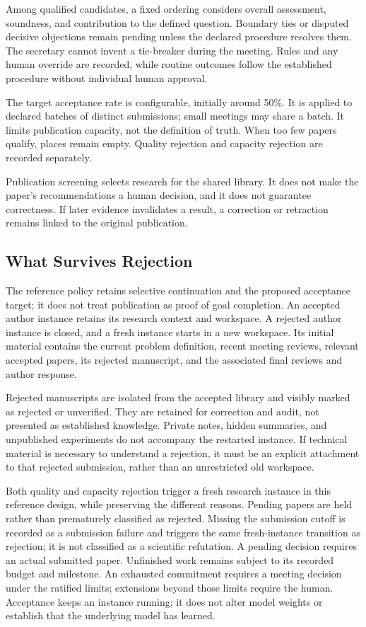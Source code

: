 \documentclass[11pt]{article}
\begin{document}
Among qualified candidates, a fixed ordering considers overall assessment, soundness, and contribution to the defined question. Boundary ties or disputed decisive objections remain pending unless the declared procedure resolves them. The secretary cannot invent a tie-breaker during the meeting. Rules and any human override are recorded, while routine outcomes follow the established procedure without individual human approval.

The target acceptance rate is configurable, initially around 50\%. It is applied to declared batches of distinct submissions; small meetings may share a batch. It limits publication capacity, not the definition of truth. When too few papers qualify, places remain empty. Quality rejection and capacity rejection are recorded separately.

Publication screening selects research for the shared library. It does not make the paper's recommendations a human decision, and it does not guarantee correctness. If later evidence invalidates a result, a correction or retraction remains linked to the original publication.

\subsection{What Survives Rejection}

The reference policy retains selective continuation and the proposed acceptance target; it does not treat publication as proof of goal completion. An accepted author instance retains its research context and workspace. A rejected author instance is closed, and a fresh instance starts in a new workspace. Its initial material contains the current problem definition, recent meeting reviews, relevant accepted papers, its rejected manuscript, and the associated final reviews and author response.

Rejected manuscripts are isolated from the accepted library and visibly marked as rejected or unverified. They are retained for correction and audit, not presented as established knowledge. Private notes, hidden summaries, and unpublished experiments do not accompany the restarted instance. If technical material is necessary to understand a rejection, it must be an explicit attachment to that rejected submission, rather than an unrestricted old workspace.

Both quality and capacity rejection trigger a fresh research instance in this reference design, while preserving the different reasons. Pending papers are held rather than prematurely classified as rejected. Missing the submission cutoff is recorded as a submission failure and triggers the same fresh-instance transition as rejection; it is not classified as a scientific refutation. A pending decision requires an actual submitted paper. Unfinished work remains subject to its recorded budget and milestone. An exhausted commitment requires a meeting decision under the ratified limits; extensions beyond those limits require the human. Acceptance keeps an instance running; it does not alter model weights or establish that the underlying model has learned.
\end{document}

